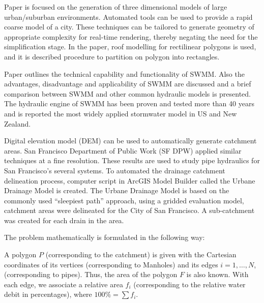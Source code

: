 \documentclass[11pt,leqno]{book}
\begin{document}
Paper \cite{3} is focused on the generation of three dimensional models of large urban/suburban environments. Automated tools can be used to provide a rapid coarse model of a city. These techniques can be tailored to generate geometry of appropriate complexity for real-time rendering, thereby negating the need for the simplification stage. In the paper, roof modelling for rectilinear polygons is used, and it is described  procedure to partition  on polygon into rectangles.

Paper \cite{4} outlines the technical capability and functionality of SWMM. Also the advantages, disadvantage and applicability of SWMM are discussed and a brief comparison between SWMM and other common hydraulic models is presented. The hydraulic engine of SWMM has been proven and tested more than 40 years and is reported the most widely applied stormwater model in US and New Zealand.

Digital elevation model (DEM) can be used to automatically generate catchment areas. San Francisco Department of Public Work (SF DPW) applied similar techniques at a fine resolution.  These results are used to study pipe hydraulics for San Francisco’s several systems. To automated the drainage catchment delineation process,  computer script in ArcGIS Model Builder called the Urbane Drainage Model is created. The Urbane Drainage Model is based on the commonly used “sleepiest path” approach,  using a gridded evaluation model, catchment areas were delineated for the City of San Francisco. A sub-catchment was created for each drain in the area.

The problem  mathematically is formulated in the following way:

A polygon $P$ (corresponding to the catchment) is given with the Cartesian coordinates of its vertices (corresponding to Manholes) and its edges $i= 1, \ldots, N$, (corresponding to pipes). Thus, the area of the polygon $F$ is also known. With each edge, we associate a relative area $f_i$ (corresponding to the relative water debit in percentages), where  $100\% = \sum f_i$.
\end{document}
